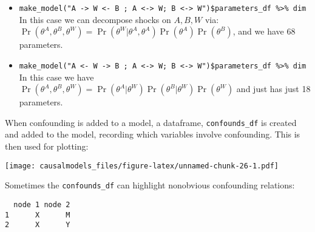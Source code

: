 \documentclass[
  12pt,
]{book}
\newenvironment{Shaded}{\begin{snugshade}}{\end{snugshade}}
\newcommand{\DataTypeTok}[1]{\textcolor[rgb]{0.13,0.29,0.53}{#1}}
\newcommand{\KeywordTok}[1]{\textcolor[rgb]{0.13,0.29,0.53}{\textbf{#1}}}
\newcommand{\NormalTok}[1]{#1}
\newcommand{\OperatorTok}[1]{\textcolor[rgb]{0.81,0.36,0.00}{\textbf{#1}}}
\newcommand{\StringTok}[1]{\textcolor[rgb]{0.31,0.60,0.02}{#1}}
\providecommand{\tightlist}{%
  \setlength{\itemsep}{0pt}\setlength{\parskip}{0pt}}
\begin{document}
\begin{itemize}
  \begin{itemize}
  \tightlist
  \item
    \texttt{make\_model("A\ -\textgreater{}\ W\ \textless{}-\ B\ ;\ A\ \textless{}-\textgreater{}\ W;\ B\ \textless{}-\textgreater{}\ W")\$parameters\_df\ \%\textgreater{}\%\ dim} In this case we can decompose shocks on \(A, B, W\) via: \(\Pr(\theta^A, \theta^B, \theta^W) = \Pr(\theta^W | \theta^A, \theta^A)\Pr(\theta^A)\Pr(\theta^B)\), and we have 68 parameters.
  \item
    \texttt{make\_model("A\ \textless{}-\ W\ -\textgreater{}\ B\ ;\ A\ \textless{}-\textgreater{}\ W;\ B\ \textless{}-\textgreater{}\ W")\$parameters\_df\ \%\textgreater{}\%\ dim} In this case we have \(\Pr(\theta^A, \theta^B, \theta^W) = \Pr(\theta^A | \theta^W)\Pr(\theta^B|\theta^W)\Pr(\theta^W)\) and just has just 18 parameters.
  \end{itemize}
\end{itemize}

When confounding is added to a model, a dataframe, \texttt{confounds\_df} is created and added to the model, recording which variables involve confounding. This is then used for plotting:

\begin{Shaded}
\end{Shaded}

\texttt{[image: causalmodels\_files/figure-latex/unnamed-chunk-26-1.pdf]}

Sometimes the \texttt{confounds\_df} can highlight nonobvious confounding relations:

\begin{Shaded}
\end{Shaded}

\begin{verbatim}
  node 1 node 2
1      X      M
2      X      Y
\end{verbatim}
\end{document}
